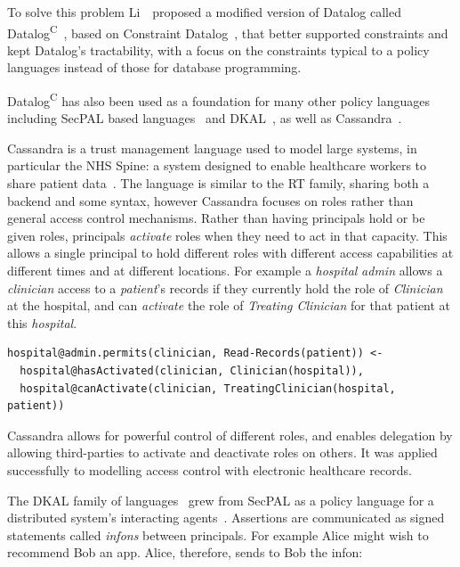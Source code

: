 \documentclass[thesis.tex]{subfiles}
\begin{document}
To solve this problem Li~\etal{}~proposed a modified version of
Datalog called Datalog\textsuperscript{C}~\cite{li_datalog_2003},
based on Constraint
Datalog~\cite{revesz_constraint_1995,revesz_safe_1998}, that better
supported constraints and kept Datalog's tractability, with a focus on
the constraints typical to a policy languages instead of those for
database programming.

Datalog\textsuperscript{C} has also been used as a foundation for many
other policy languages including SecPAL based
languages~\cite{aziz_secpal4dsa:_2011,becker_secpal:_2010,becker_framework_2009,hallett_apppal_2016}
and DKAL~\cite{gurevich_dkal:_2008}, as well as
Cassandra~\cite{becker_cassandra:_2004}.

Cassandra is a trust management language used to model large systems,
in particular the NHS Spine: a system designed to enable healthcare
workers to share patient
data~\cite{becker_cassandra:_2004,becker_cassandra:_2004-1}.  The
language is similar to the RT family, sharing both a backend and some
syntax, however Cassandra focuses on roles rather than general access
control mechanisms.  Rather than having principals hold or be given
roles, principals \emph{activate} roles when they need to act in that
capacity.  This allows a single principal to hold different roles with
different access capabilities at different times and at different
locations.  For example a \emph{hospital} \emph{admin} allows a
\emph{clinician} access to a \emph{patient}'s records if they
currently hold the role of \emph{Clinician} at the hospital, and can
\emph{activate} the role of \emph{Treating Clinician} for that patient
at this \emph{hospital}.

\begin{lstlisting}
hospital@admin.permits(clinician, Read-Records(patient)) <-
  hospital@hasActivated(clinician, Clinician(hospital)),
  hospital@canActivate(clinician, TreatingClinician(hospital, patient))
\end{lstlisting}

Cassandra allows for powerful control of different roles, and enables
delegation by allowing third-parties to activate and deactivate roles
on others.  It was applied successfully to modelling access control
with electronic healthcare records.

The DKAL family of
languages~\cite{jeannin_dkal*:_2013,gurevich_dkal:_2008,yuri_gurevich_dkal2---simplified_2009}
grew from SecPAL as a policy language for a distributed system's
interacting agents~\cite{blass_introduction_2012}.  Assertions are
communicated as signed statements called \emph{infons} between
principals.  For example Alice might wish to recommend Bob an app.
Alice, therefore, sends to Bob the infon:
\end{document}
